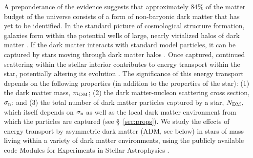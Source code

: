 \documentclass[useAMS,usenatbib]{mnras}
\begin{document}
  A preponderance of the evidence suggests that approximately $84\%$ of the matter budget of the
  universe consists of a form of non-baryonic dark matter that has yet to be identified.
   In
  the standard picture of cosmological structure formation,
  galaxies form within the potential wells of
  large, nearly virialized halos of dark matter \citep{white_rees78,blumenthal_etal84}.
  If the dark matter interacts with standard model particles,
  it can be captured by stars moving through dark matter halos
  \citep{press_spergel85,krauss_etal85, gaisser_etal86, griest_seckel87}.
  Once captured, continued scattering within the stellar interior contributes
  to energy transport within the star, potentially altering its evolution \citep{Spergel1985EffectInterior, Zentner2011AsymmetricDwarfs}
   .
  The significance of this energy transport depends on the following
  properties (in addition to the properties of the star):
  (1) the dark matter mass, $m_{\mathrm{DM}}$;
  (2) the dark matter-nucleon scattering cross section, $\sigma_{\mathrm{n}}$;
  and (3) the total number of dark matter particles captured by a star, $N_{\mathrm{DM}}$,
  which itself depends on $\sigma_{\mathrm{n}}$ as well as the local dark matter environment from
  which the particles are captured (see \S~\ref{sec:props}).
  We study the effects of energy transport by asymmetric dark matter
  (ADM, see below)
  in stars of mass \mrange living within a variety of dark matter
  environments, using the publicly available code
  Modules for Experiments in Stellar Astrophysics \citep[\mesa,][]{Paxton2011ModulesMESA}.
\end{document}
